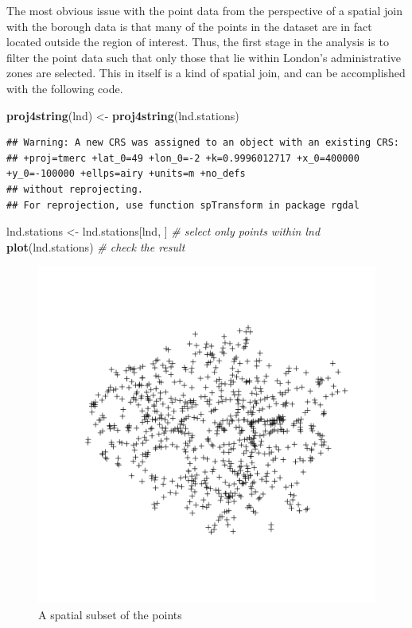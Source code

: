 \documentclass[]{article}
\makeatletter
\newenvironment{Shaded}{}{}
\newcommand{\KeywordTok}[1]{\textcolor[rgb]{0.00,0.44,0.13}{\textbf{{#1}}}}
\newcommand{\StringTok}[1]{\textcolor[rgb]{0.25,0.44,0.63}{{#1}}}
\newcommand{\CommentTok}[1]{\textcolor[rgb]{0.38,0.63,0.69}{\textit{{#1}}}}
\newcommand{\NormalTok}[1]{{#1}}
\def\maxwidth{\ifdim\Gin@nat@width>\linewidth\linewidth
\else\Gin@nat@width\fi}
\let\Oldincludegraphics\includegraphics
\renewcommand{\includegraphics}[1]{\Oldincludegraphics[width=\maxwidth]{#1}}
\makeatother
\begin{document}
The most obvious issue with the point data from the perspective of a
spatial join with the borough data is that many of the points in the
dataset are in fact located outside the region of interest. Thus, the
first stage in the analysis is to filter the point data such that only
those that lie within London's administrative zones are selected. This
in itself is a kind of spatial join, and can be accomplished with the
following code.

\begin{Shaded}
\begin{Highlighting}[]
\KeywordTok{proj4string}\NormalTok{(lnd) <-}\StringTok{ }\KeywordTok{proj4string}\NormalTok{(lnd.stations)}
\end{Highlighting}
\end{Shaded}

\begin{verbatim}
## Warning: A new CRS was assigned to an object with an existing CRS:
## +proj=tmerc +lat_0=49 +lon_0=-2 +k=0.9996012717 +x_0=400000 +y_0=-100000 +ellps=airy +units=m +no_defs
## without reprojecting.
## For reprojection, use function spTransform in package rgdal
\end{verbatim}

\begin{Shaded}
\begin{Highlighting}[]
\NormalTok{lnd.stations <-}\StringTok{ }\NormalTok{lnd.stations[lnd, ]  }\CommentTok{# select only points within lnd}
\KeywordTok{plot}\NormalTok{(lnd.stations)  }\CommentTok{# check the result}
\end{Highlighting}
\end{Shaded}

\begin{figure}[htbp]
\centering
\includegraphics{figure/A_spatial_subset_of_the_points.png}
\caption{A spatial subset of the points}
\end{figure}
\end{document}
